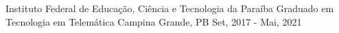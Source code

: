 
\begin{cventries}
  \cventry
  {Instituto Federal de Educação, Ciência e Tecnologia da Paraíba} %
  {Graduado em Tecnologia em Telemática} %
  {Campina Grande, PB} %
  {Set, 2017 - Mai, 2021} %
  {}
\end{cventries}
